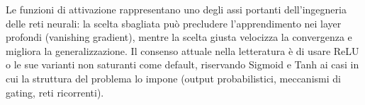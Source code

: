 Le funzioni di attivazione rappresentano uno degli assi portanti
dell'ingegneria delle reti neurali: la scelta sbagliata può precludere
l'apprendimento nei layer profondi (vanishing gradient), mentre la scelta
giusta velocizza la convergenza e migliora la generalizzazione.
Il consenso attuale nella letteratura è di usare ReLU o le sue varianti
non saturanti come default, riservando Sigmoid e Tanh ai casi in cui
la struttura del problema lo impone (output probabilistici, meccanismi
di gating, reti ricorrenti).
